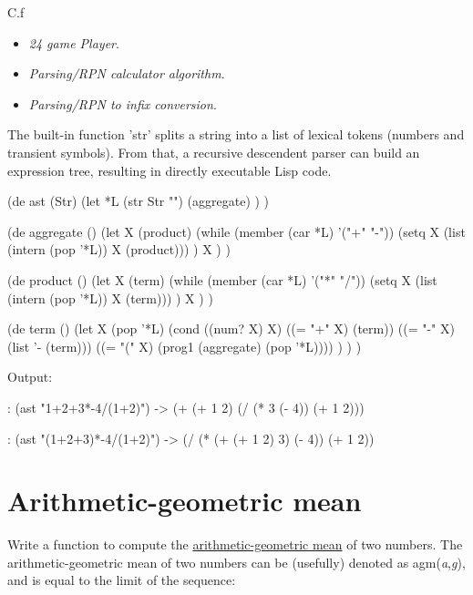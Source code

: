 \begin{description}
\item[C.f]
\end{description}

\begin{itemize}
\item
  \emph{24 game Player}.
\item
  \emph{Parsing/RPN calculator algorithm}.
\item
  \emph{Parsing/RPN to infix conversion}.
\end{itemize}


\begin{wideverbatim}

The built-in function 'str' splits a string into a list of lexical tokens
(numbers and transient symbols). From that, a recursive descendent parser can
build an expression tree, resulting in directly executable Lisp code.

(de ast (Str)
   (let *L (str Str "")
      (aggregate) ) )

(de aggregate ()
   (let X (product)
      (while (member (car *L) '("+" "-"))
         (setq X (list (intern (pop '*L)) X (product))) )
      X ) )

(de product ()
   (let X (term)
      (while (member (car *L) '("*" "/"))
         (setq X (list (intern (pop '*L)) X (term))) )
      X ) )

(de term ()
   (let X (pop '*L)
      (cond
         ((num? X) X)
         ((= "+" X) (term))
         ((= "-" X) (list '- (term)))
         ((= "(" X) (prog1 (aggregate) (pop '*L)))) ) ) )

Output:

: (ast "1+2+3*-4/(1+2)")
-> (+ (+ 1 2) (/ (* 3 (- 4)) (+ 1 2)))

: (ast "(1+2+3)*-4/(1+2)")
-> (/ (* (+ (+ 1 2) 3) (- 4)) (+ 1 2))

\end{wideverbatim}

\pagebreak{}
\section*{Arithmetic-geometric mean}

Write a function to compute the
\href{http://en.wikipedia.org/wiki/Arithmetic-geometric\_mean}{arithmetic-geometric
  mean} of two numbers. The arithmetic-geometric mean of two numbers
can be (usefully) denoted as agm(\emph{a},\emph{g}), and is equal to
the limit of the sequence:

